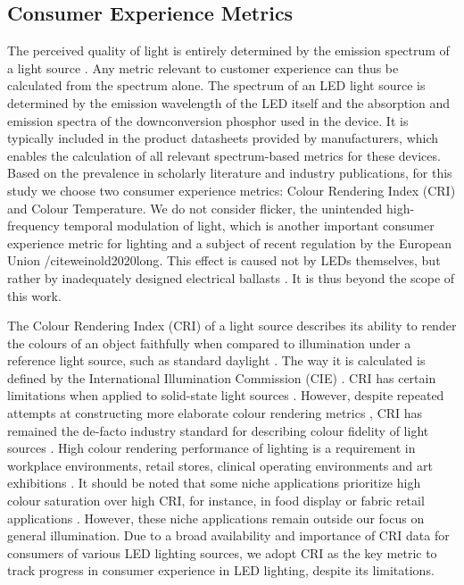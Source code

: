 \documentclass[twoside,twocolumn,9pt]{article}
\begin{document}
\subsection{Consumer Experience Metrics}

The perceived quality of light is entirely determined by the emission spectrum of a light source \cite{ies_handbook}. Any metric relevant to customer experience can thus be calculated from the spectrum alone. The spectrum of an LED light source is determined by the emission wavelength of the LED itself and the absorption and emission spectra  of the downconversion phosphor used in the device. It is typically included in the product datasheets provided by manufacturers, which enables the calculation of all relevant spectrum-based metrics for these devices. Based on the prevalence in scholarly literature and industry publications, for this study we choose two consumer experience metrics: Colour Rendering Index (CRI) and Colour Temperature. We do not consider flicker, the unintended high-frequency temporal modulation of light, which is another important consumer experience metric for lighting and a subject of recent regulation by the European Union /cite{weinold2020long}. This effect is caused not by LEDs themselves, but rather by inadequately designed electrical ballasts \cite{Lehman2014}. It is thus beyond the scope of this work. 

The Colour Rendering Index (CRI) of a light source describes its ability to render the colours of an object faithfully when compared to illumination under a reference light source, such as standard daylight \cite{khan2015led}. The way it is calculated is defined by the International Illumination Commission (CIE) \cite{cie_cri_1995}. CRI has certain limitations when applied to solid-state light sources \cite{david2013cri}. However, despite repeated attempts at constructing more elaborate colour rendering metrics \cite{Houser2013}, CRI has remained the de-facto industry standard for describing colour fidelity of light sources \cite{DoE2016LED}. High colour rendering performance of lighting is a requirement in workplace environments, retail stores, clinical operating environments and art exhibitions \cite{khanh2017color}. It should be noted that some niche applications prioritize high colour saturation over high CRI, for instance, in food display or fabric retail applications \cite{david2013cri}. However, these niche applications remain outside our focus on general illumination. Due to a broad availability and importance of CRI data for consumers of various LED lighting sources, we adopt CRI as the key metric to track progress in consumer experience in LED lighting, despite its limitations. 
\end{document}
